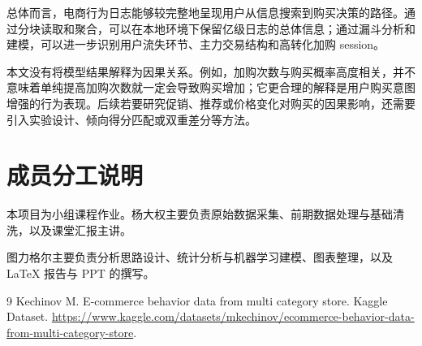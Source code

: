 \documentclass[12pt,hyperref,a4paper,UTF8]{ctexart}
\begin{document}
总体而言，电商行为日志能够较完整地呈现用户从信息搜索到购买决策的路径。通过分块读取和聚合，可以在本地环境下保留亿级日志的总体信息；通过漏斗分析和建模，可以进一步识别用户流失环节、主力交易结构和高转化加购 session。

本文没有将模型结果解释为因果关系。例如，加购次数与购买概率高度相关，并不意味着单纯提高加购次数就一定会导致购买增加；它更合理的解释是用户购买意图增强的行为表现。后续若要研究促销、推荐或价格变化对购买的因果影响，还需要引入实验设计、倾向得分匹配或双重差分等方法。

\section*{成员分工说明}

本项目为小组课程作业。杨大权主要负责原始数据采集、前期数据处理与基础清洗，以及课堂汇报主讲。

图力格尔主要负责分析思路设计、统计分析与机器学习建模、图表整理，以及 LaTeX 报告与 PPT 的撰写。

\begin{thebibliography}{9}
Kechinov M. E-commerce behavior data from multi category store. Kaggle Dataset. \url{https://www.kaggle.com/datasets/mkechinov/ecommerce-behavior-data-from-multi-category-store}.
\end{thebibliography}
\end{document}
